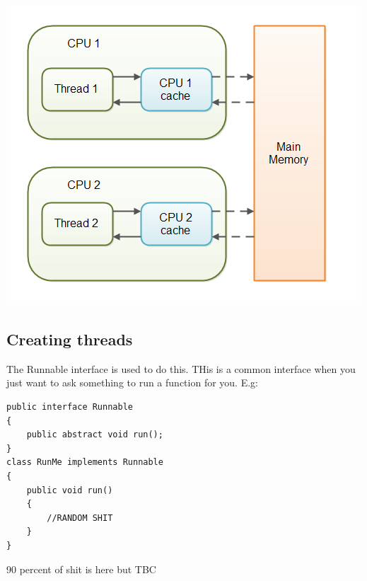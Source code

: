 \documentclass{article}
\begin{document}
\begin{center}
\includegraphics[scale=0.6]{volatile.png}
\end{center}

\subsection{Creating threads}

The Runnable interface is used to do this. THis is a common interface when you just want to ask something to run a function for you. E.g:

\begin{lstlisting}
public interface Runnable
{
	public abstract void run();
}
class RunMe implements Runnable
{
	public void run()
	{
		//RANDOM SHIT
	}
}
\end{lstlisting}

90 percent of shit is here but TBC
\end{document}
